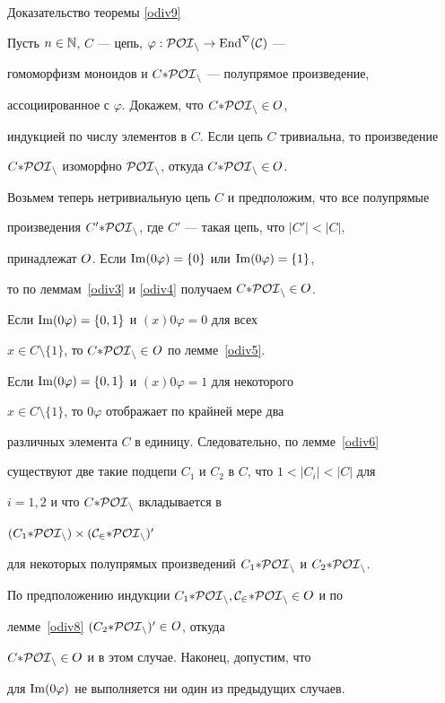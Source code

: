 \begin{pf*}{Доказательство теоремы \ref{odiv9}}


Пусть $n\in\Bbb N$, $C$ --- цепь, $\varphi:\cal{POI}_n\rightarrow\operatorname{End}^r(C)$ ---


гомоморфизм моноидов и $C{*} \cal{POI}_n$ --- полупрямое произведение,


ассоциированное с $\varphi$. Докажем, что $C{*} \cal{POI}_n\in$\,$\boldmath{O}$,


индукцией по числу элементов в $C$. Если цепь $C$ тривиальна, то произведение


$C{*} \cal{POI}_n$ изоморфно $\cal{POI}_n$, откуда $C{*} \cal{POI}_n\in$\,$\boldmath{O}$.





Возьмем теперь нетривиальную цепь $C$ и предположим, что все полупрямые


произведения $C'{*} \cal{POI}_n$, где $C'$ --- такая цепь, что $|C'|<|C|$,


принадлежат $\boldmath{O}$. Если $\operatorname{Im}(0\varphi)=\{0\}$ или $\operatorname{Im}(0\varphi)=\{1\}$,


то по леммам~\ref{odiv3} и \ref{odiv4} получаем $C{*} \cal{POI}_n\in$\,$\boldmath{O}$.


Если $\operatorname{Im}(0\varphi)=\{0,1\}$ и $(x)0\varphi=0$ для всех


$x\in C\setminus\{1\}$, то $C{*} \cal{POI}_n\in$\,$\boldmath{O}$ по лемме~\ref{odiv5}.


Если $\operatorname{Im}(0\varphi)=\{0,1\}$ и $(x)0\varphi=1$ для некоторого


$x\in C\setminus\{1\}$, то $0\varphi$ отображает по крайней мере два


различных элемента $C$ в единицу. Следовательно, по лемме~\ref{odiv6}


существуют две такие подцепи $C_1$ и $C_2$ в $C$, что $1<|C_i|<|C|$ для


$i=1,2$ и что $C{*} \cal{POI}_n$ вкладывается в


$(C_1{*} \cal{POI}_n)\times(C_2{*} \cal{POI}_n)^0$


для некоторых полупрямых произведений $C_1{*} \cal{POI}_n$ и $C_2{*} \cal{POI}_n$.


По предположению индукции $C_1{*} \cal{POI}_n, C_2{*} \cal{POI}_n\in$\,$\boldmath{O}$ и по


лемме~\ref{odiv8}\; $(C_2{*} \cal{POI}_n)^0\in$\,$\boldmath{O}$, откуда


$C{*} \cal{POI}_n\in$\,$\boldmath{O}$ и в этом случае. Наконец, допустим, что


для $\operatorname{Im}(0\varphi)$ не выполняется ни один из предыдущих случаев.



\end{pf*}
